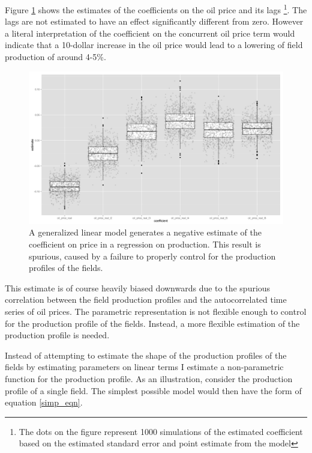 \documentclass[12pt]{article}
\begin{document}
Figure \ref{glm_dirty_box} shows the estimates of the coefficients on the oil price and its lags \footnote{The dots on the figure represent 1000 simulations of the estimated coefficient based on the estimated standard error and point estimate from the model}.  The lags are not estimated to have an effect significantly different from zero. However a literal interpretation of the coefficient on the concurrent oil price term would indicate that a 10-dollar increase in the oil price would lead to a lowering of field production of around 4-5\%.

\begin{figure}
\includegraphics[width=1\textwidth]{figures/glm_dirty_box_print.png}
\caption{A generalized linear model generates a negative estimate of the coefficient on price in a regression on production.  This result is spurious, caused by a failure to properly control for the production profiles of the fields.}
\label{glm_dirty_box}
\end{figure}

This estimate is of course heavily biased downwards due to the spurious correlation between the field production profiles and the autocorrelated time series of oil prices.  The parametric representation is not flexible enough to control for the production profile of the fields.  Instead, a more flexible estimation of the production profile is needed. 

Instead of attempting to estimate the shape of the production profiles of the fields by estimating parameters on linear terms I estimate a non-parametric function for the production profile.  As an illustration, consider the production profile of a single field.  The simplest possible model would then have the form of equation \ref{simp_eqn}. 
\end{document}
